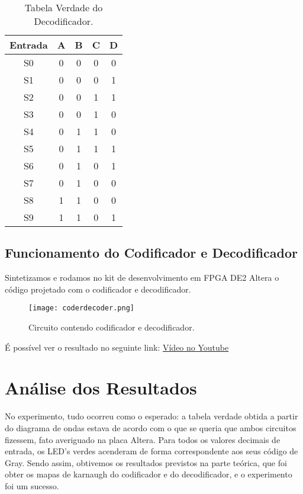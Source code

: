 \documentclass[12pt]{article}
\begin{document}
\begin{table}[H]
	\centering
	\caption{Tabela Verdade do Decodificador.}
	\begin{tabular}{|c|c|c|c|c|}
		\cline{1-5}
		\multicolumn{1}{|c|}{Entrada} & \multicolumn{1}{|c|}{A} & \multicolumn{1}{|c|}{B} & \multicolumn{1}{|c|}{C} & \multicolumn{1}{|c|}{D}\\
		\hline
		S0 & 0 & 0 & 0 & 0 \\
		\hline
		S1 & 0 & 0 & 0 & 1 \\
		\hline
		S2 & 0 & 0 & 1 & 1 \\
		\hline
		S3 & 0 & 0 & 1 & 0 \\
		\hline
		S4 & 0 & 1 & 1 & 0 \\
		\hline
		S5 & 0 & 1 & 1 & 1 \\
		\hline
		S6 & 0 & 1 & 0 & 1 \\
		\hline
		S7 & 0 & 1 & 0 & 0 \\
		\hline
		S8 & 1 & 1 & 0 & 0 \\
		\hline
		S9 & 1 & 1 & 0 & 1 \\
		\hline
	\end{tabular}
	
\end{table} 




\subsection{Funcionamento do Codificador e Decodificador}

Sintetizamos e rodamos no kit de desenvolvimento em FPGA DE2 Altera o código projetado com o codificador e decodificador. 

\begin{figure}[H]
	\centering
	\texttt{[image: coderdecoder.png]}
	\caption{Circuito contendo codificador e decodificador.}
	\label{fig:coderdecoder}
\end{figure}

É possível ver o resultado no seguinte link: \href{https://www.youtube.com/watch?v=paRaiHqDqBo}{Vídeo no Youtube}


\section{Análise dos Resultados}
\label{sec:Resultados}

No experimento, tudo ocorreu como o esperado: a tabela verdade obtida a partir do diagrama de ondas estava de acordo com o que se queria que ambos circuitos fizessem, fato averiguado na placa Altera. Para todos os valores decimais de entrada, os LED’s verdes acenderam de forma correspondente aos seus código de Gray.
Sendo assim, obtivemos os resultados previstos na parte teórica, que foi obter os mapas de karnaugh do codificador e do decodificador, e o experimento foi um sucesso. 
\end{document}
